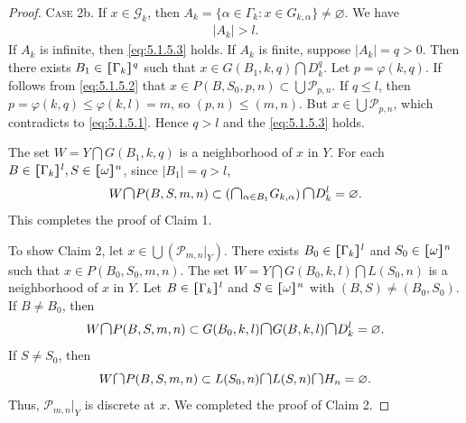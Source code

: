 \documentclass[main.tex]{subfiles}
\begin{document}
\begin{proof}
\textsc{Case 2}b.
If $x\in \mathscr{G}_k$, then $A_{k} = \{\alpha\in \Gamma_k: x\in G_{k, \alpha}\} \ne \varnothing$. 
We have 
\begin{gather}
	\vert{}A_k\vert{} > l. \label{eq:5.1.5.3}
\end{gather}
If $A_k$ is infinite, then \eqref{eq:5.1.5.3} holds. 
If $A_k$ is finite, suppose $\vert{}A_k\vert{} = q > 0$. 
Then there exists $B_1 \in \hstretch{1.8}{[}\Gamma_k\hstretch{1.8}{]}^q$ such that 
$x \in G(B_1, k, q)\bigcap D_k^q$. Let $p = \varphi(k, q)$. If follows from
\eqref{eq:5.1.5.2} that $x\in P(B, S_0, p, n) \subset \bigcup\mathscr{P}_{p, n}$.
If $q \le l$, then $p =\varphi(k, q) \le \varphi(k, l) = m$, so $(p, n) \le (m, n)$. 
But $x \in \bigcup \mathscr{P}_{p,n}$, which contradicts to \eqref{eq:5.1.5.1}. 
Hence $q > l$ and the \eqref{eq:5.1.5.3} holds.

The set $W = Y\bigcap G(B_1, k, q)$ is a neighborhood of $x$ in $Y$.
For each $B\in \hstretch{1.8}{[}\Gamma_k\hstretch{1.8}{]}^l, S\in \hstretch{1.8}{[}\omega\hstretch{1.8}{]}^n$, 
since $|B_1|  = q > l$, 
\begin{gather*}
W \raisebox{-1pt}{\scalebox{1.5}{$\cap$}} P(B, S, m, n) \subset
 \left(\raisebox{-1pt}{\scalebox{1.5}{$\cap$}}_{\alpha \in B_1} G_{k,\alpha}\right) 
 \raisebox{-1pt}{\scalebox{1.5}{$\cap$}} D_k^l 
= \varnothing.
\end{gather*} 
This completes the proof of Claim 1.

To show Claim 2, let $x \in \bigcup (\mathscr{P}_{m,n}|_Y)$. 
There exists $B_0 \in \hstretch{1.8}{[}\Gamma_k\hstretch{1.8}{]}^l$ and $S_0\in \hstretch{1.8}{[}\omega\hstretch{1.8}{]}^n$ 
such that $x \in P(B_0, S_0, m, n)$.
The set $W = Y\bigcap G(B_0, k, l) \bigcap L(S_0, n)$ is a neighborhood of $x$ in $Y$.
Let  $B\in \hstretch{1.8}{[}\Gamma_k\hstretch{1.8}{]}^l$ and $S\in \hstretch{1.8}{[}\omega\hstretch{1.8}{]}^n$ with $(B, S) \neq (B_0, S_0)$.
If $B \neq B_0$, then 
$$W \raisebox{-1pt}{\scalebox{1.5}{$\cap$}} P(B, S, m, n) \subset G(B_0, k, l) 
\raisebox{-1pt}{\scalebox{1.5}{$\cap$}} G(B, k, l) 
\raisebox{-1pt}{\scalebox{1.5}{$\cap$}} D_k^l = \varnothing.$$
If $S \neq S_0$, then 
$$W \raisebox{-1pt}{\scalebox{1.5}{$\cap$}} P(B, S, m, n) \subset L(S_0, n) 
\raisebox{-1pt}{\scalebox{1.5}{$\cap$}} L(S,n)
\raisebox{-1pt}{\scalebox{1.5}{$\cap$}} H_n = \varnothing.$$
Thus, $\mathscr{P}_{m,n}|_Y$ is discrete at $x$. We completed the proof of Claim 2.
\end{proof}


\end{document}
